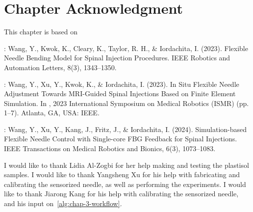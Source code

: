 
\section{Chapter Acknowledgment}
\label{sec:chap-3-ack}
This chapter is based on

\parencite{wangFlexibleNeedleBending2023}: Wang, Y., Kwok, K., Cleary, K., Taylor, R. H., \& Iordachita, I. (2023). Flexible Needle Bending Model for Spinal Injection Procedures. IEEE Robotics and Automation Letters, 8(3), 1343–1350.

\parencite{wangSituFlexibleNeedle2023}: Wang, Y., Xu, Y., Kwok, K., \& Iordachita, I. (2023). In Situ Flexible Needle Adjustment Towards MRI-Guided Spinal Injections Based on Finite Element Simulation. In , 2023 International Symposium on Medical Robotics (ISMR) (pp. 1–7). Atlanta, GA, USA: IEEE.

\parencite{wangSimulationbasedFlexibleNeedle2024}: Wang, Y., Xu, Y., Kang, J., Fritz, J., \& Iordachita, I. (2024). Simulation-based Flexible Needle Control with Single-core FBG Feedback for Spinal Injections. IEEE Transactions on Medical Robotics and Bionics, 6(3), 1073–1083. 

I would like to thank Lidia Al-Zogbi for her help making and testing the plastisol samples. I would like to thank Yangsheng Xu for his help with fabricating and calibrating the sensorized needle, as well as performing the experiments. I would like to thank Jiarong Kang for his help with calibrating the sensorized needle, and his input on~\cref{alg:chap-3-workflow}.

